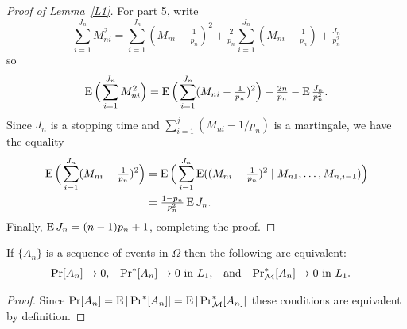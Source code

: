 \documentclass[11pt]{article}
\begin{document}
\begin{proof}[Proof of Lemma~\ref{L1}]
  For part 5, write
  \begin{equation}\label{eq:41}
    \sum_{i=1}^{J_n} M_{ni}^2 =
    \sum_{i=1}^{J_n} (M_{ni} - \tfrac{1}{p_n})^2
    + \tfrac{2}{p_n} \sum_{i=1}^{J_n} (M_{ni} - \tfrac{1}{p_n})
    + \tfrac{J_n}{p_n^2}
  \end{equation}
  so
  \begin{equation*}
    \operatorname{E} \Big( \sum_{i=1}^{J_n} M_{ni}^2 \Big)
    = \operatorname{E}\Big( \sum_{i=1}^{J_n} (M_{ni} - \tfrac{1}{p_n})^2 \Big)
    + \tfrac{2 n}{p_n} - \operatorname{E} \tfrac{J_n}{p_n^2}.
  \end{equation*}
  Since $J_n$ is a stopping time and $\sum_{i=1}^j (M_{ni} - 1/p_n)$
  is a martingale, we have the equality \citep[Lemma 6]{CRT:65}
  \begin{align*}
    \operatorname{E}\Big( \sum_{i=1}^{J_n} (M_{ni} - \tfrac{1}{p_n})^2 \Big)
    &= \operatorname{E}\Big( \sum_{i=1}^{J_n} \operatorname{E}((M_{ni} - \tfrac{1}{p_n})^2 \mid M_{n1},\dots,M_{n,i-1})\Big)\\
    &= \tfrac{1 - p_n}{p_n^2} \operatorname{E} J_n.
  \end{align*}
  Finally, $\operatorname{E} J_n = (n-1) p_n + 1$, completing the proof.
\end{proof}

\begin{lem}\label{L2}
  If $\{A_n\}$ is a sequence of events in $\Omega$ then the following
  are equivalent:
  \begin{align*}
  \operatorname{Pr}[A_n] &\to 0, &
  \operatorname{Pr}^*[A_n] &\to 0 \text{\ in\ }L_1, &
  &\text{and}&
  \operatorname{Pr}_{\mathcal{M}}^*[A_n] &\to 0 \text{\ in\ }L_1.
  \end{align*}
\end{lem}
\begin{proof}
  Since $\operatorname{Pr}[A_n] = \operatorname{E} |\operatorname{Pr}^*[A_n]| = \operatorname{E} |\operatorname{Pr}^*_{\mathcal{M}}[A_n]|$ these
  conditions are equivalent by definition.
\end{proof}
\end{document}
